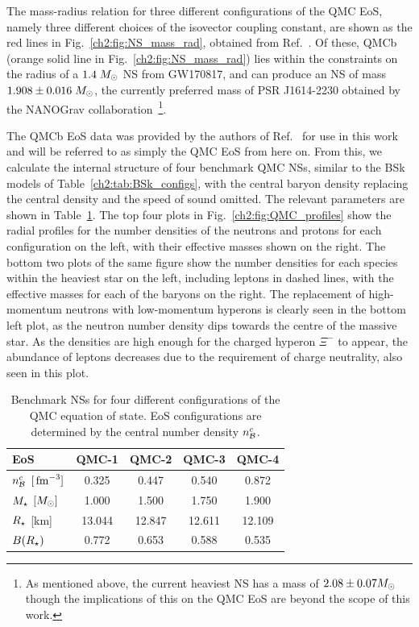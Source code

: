 The mass-radius relation for three different configurations of the QMC EoS, namely three different choices of the isovector coupling constant, are shown as the red lines in Fig.~\ref{ch2:fig:NS_mass_rad}, obtained from Ref.~\cite{Motta:2019tjc_Isovectoreffectsneutron}. Of these, QMCb (orange solid line in Fig.~\ref{ch2:fig:NS_mass_rad}) lies within the constraints on the radius of a $1.4\;M_\odot$ NS from GW170817, and can produce an NS of mass $1.908 \pm 0.016\;M_\odot$, the currently preferred mass of PSR J1614-2230 obtained by the NANOGrav collaboration~\cite{NANOGrav:2017wvv_apr_NANOGrav11yearData}\footnote{As mentioned above, the current heaviest NS has a mass of $2.08\pm 0.07M_\odot$ though the implications of this on the QMC EoS are beyond the scope of this work.}.

The QMCb EoS data was provided by the authors of Ref.~\cite{Motta:2019tjc_Isovectoreffectsneutron} for use in this work and will be referred to as simply the QMC EoS from here on. From this, we calculate the internal structure of four benchmark QMC NSs, similar to the BSk models of Table~\ref{ch2:tab:BSk_configs}, with the central baryon density replacing the central density and the speed of sound omitted. The relevant parameters are shown in Table~\ref{ch2:tab:QMC_configs}. The top four plots in Fig.~\ref{ch2:fig:QMC_profiles} show the radial profiles for the number densities of the neutrons and protons for each configuration on the left, with their effective masses shown on the right. The bottom two plots of the same figure show the number densities for each species within the heaviest star on the left, including leptons in dashed lines, with the effective masses for each of the baryons on the right. The replacement of high-momentum neutrons with low-momentum hyperons is clearly seen in the bottom left plot, as the neutron number density dips towards the centre of the massive star. As the densities are high enough for the charged hyperon $\Xi^-$ to appear, the abundance of leptons decreases due to the requirement of charge neutrality, also seen in this plot. 

\begin{table}[t!bp]
    \centering
    \begin{tabular}{l c c c c}
    \toprule
     EoS &  QMC-1 &  QMC-2 &  QMC-3 &  QMC-4 \\ \midrule\midrule
    $n_{\cal B}^c$ $[{\rm \,fm}^{-3}]$ & 0.325 & 0.447 & 0.540 & 0.872\\
    $M_\star$ $[M_\odot]$ & 1.000 & 1.500 & 1.750 & 1.900  \\
    $R_\star$ [km] &  13.044 & 12.847 & 12.611 & 12.109 \\
    $B(R_\star)$ & 0.772 & 0.653 & 0.588 & 0.535\\
    \bottomrule
    \end{tabular} 
    \caption[Benchmark NSs for four different configurations of the QMC equation of state.]{Benchmark NSs for four different configurations of the QMC equation of state. 
    EoS configurations are determined by the central number density $n_{\cal B}^c$.
    }
    \label{ch2:tab:QMC_configs}
\end{table} 

